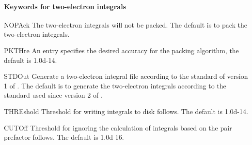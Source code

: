 \paragraph{Keywords for two-{}electron integrals}
\begin{keywordlist}
\item[NOPAck]
The two-{}electron integrals will not be packed. The default is to
pack the two-{}electron integrals.
\item[PKTHre]
An entry specifies the desired accuracy for the packing
algorithm, the default is 1.0d-{}14.
\item[STDOut]
Generate a two-{}electron integral file according to the standard of
version 1 of \molcas. The default is to generate the
two-{}electron integrals according to the standard used since version 2 of
\molcas.
\item[THREshold]
Threshold for writing integrals to disk follows. The default is 1.0d-{}14.
\item[CUTOff]
Threshold for ignoring the calculation of integrals based on the
pair prefactor follows. The default is 1.0d-{}16.
\end{keywordlist}

